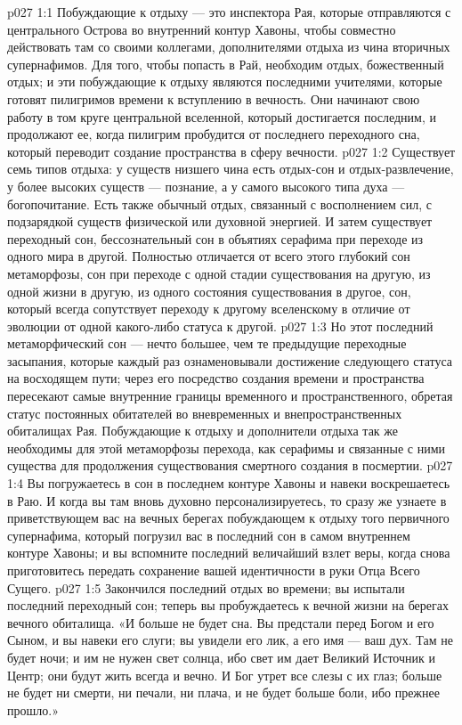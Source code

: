\vs p027 1:1 Побуждающие к отдыху --- это инспектора Рая, которые отправляются с центрального Острова во внутренний контур Хавоны, чтобы совместно действовать там со своими коллегами, дополнителями отдыха из чина вторичных супернафимов. Для того, чтобы попасть в Рай, необходим отдых, божественный отдых; и эти побуждающие к отдыху являются последними учителями, которые готовят пилигримов времени к вступлению в вечность. Они начинают свою работу в том круге центральной вселенной, который достигается последним, и продолжают ее, когда пилигрим пробудится от последнего переходного сна, который переводит создание пространства в сферу вечности.
\vs p027 1:2 \pc Существует семь типов отдыха: у существ низшего чина есть отдых\hyp{}сон и отдых\hyp{}развлечение, у более высоких существ --- познание, а у самого высокого типа духа --- богопочитание. Есть также обычный отдых, связанный с восполнением сил, с подзарядкой существ физической или духовной энергией. И затем существует переходный сон, бессознательный сон в объятиях серафима при переходе из одного мира в другой. Полностью отличается от всего этого глубокий сон метаморфозы, сон при переходе с одной стадии существования на другую, из одной жизни в другую, из одного состояния существования в другое, сон, который всегда сопутствует переходу к другому вселенскому  в отличие от эволюции от одной  какого\hyp{}либо статуса к другой.
\vs p027 1:3 Но этот последний метаморфический сон --- нечто большее, чем те предыдущие переходные засыпания, которые каждый раз ознаменовывали достижение следующего статуса на восходящем пути; через его посредство создания времени и пространства пересекают самые внутренние границы временного и пространственного, обретая статус постоянных обитателей во вневременных и внепространственных обиталищах Рая. Побуждающие к отдыху и дополнители отдыха так же необходимы для этой метаморфозы перехода, как серафимы и связанные с ними существа для продолжения существования смертного создания в посмертии.
\vs p027 1:4 \pc Вы погружаетесь в сон в последнем контуре Хавоны и навеки воскрешаетесь в Раю. И когда вы там вновь духовно персонализируетесь, то сразу же узнаете в приветствующем вас на вечных берегах побуждающем к отдыху того первичного супернафима, который погрузил вас в последний сон в самом внутреннем контуре Хавоны; и вы вспомните последний величайший взлет веры, когда снова приготовитесь передать сохранение вашей идентичности в руки Отца Всего Сущего.
\vs p027 1:5 Закончился последний отдых во времени; вы испытали последний переходный сон; теперь вы пробуждаетесь к вечной жизни на берегах вечного обиталища. «И больше не будет сна. Вы предстали перед Богом и его Сыном, и вы навеки его слуги; вы увидели его лик, а его имя --- ваш дух. Там не будет ночи; и им не нужен свет солнца, ибо свет им дает Великий Источник и Центр; они будут жить всегда и вечно. И Бог утрет все слезы с их глаз; больше не будет ни смерти, ни печали, ни плача, и не будет больше боли, ибо прежнее прошло.»
